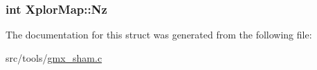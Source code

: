 \hypertarget{structXplorMap_aa4902c553999c706302a6c250933d745}{
\subsubsection[{\-Nz}]{\setlength{\rightskip}{0pt plus 5cm}int {\bf \-Xplor\-Map\-::\-Nz}}}\label{structXplorMap_aa4902c553999c706302a6c250933d745}


\-The documentation for this struct was generated from the following file\-:\begin{DoxyCompactItemize}
\item 
src/tools/\hyperlink{gmx__sham_8c}{gmx\-\_\-sham.\-c}\end{DoxyCompactItemize}
